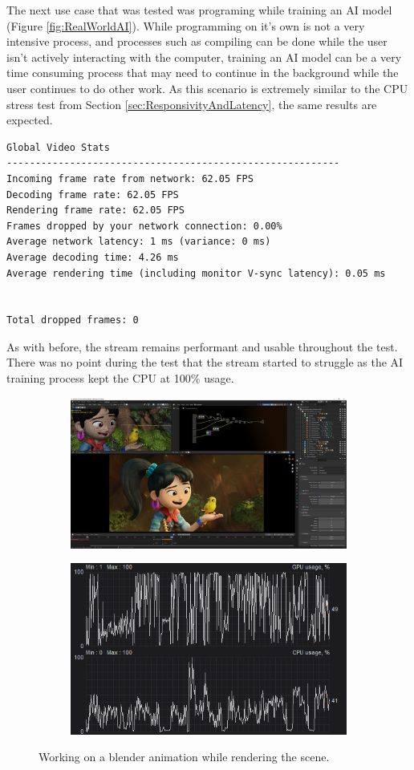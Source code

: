 The next use case that was tested was programing while training an AI model (Figure \ref{fig:RealWorldAI}).
While programming on it's own is not a very intensive process, and processes such as compiling can be done while the user isn't actively interacting with the computer, training an AI model can be a very time consuming process that may need to continue in the background while the user continues to do other work.
As this scenario is extremely similar to the CPU stress test from Section \ref{sec:ResponsivityAndLatency}, the same results are expected.

\begin{lstlisting}[style=plaintext,title=Statistics recorded while training an AI (Figure \ref{fig:RealWorldAI})]
Global Video Stats
----------------------------------------------------------
Incoming frame rate from network: 62.05 FPS
Decoding frame rate: 62.05 FPS
Rendering frame rate: 62.05 FPS
Frames dropped by your network connection: 0.00%
Average network latency: 1 ms (variance: 0 ms)
Average decoding time: 4.26 ms
Average rendering time (including monitor V-sync latency): 0.05 ms


Total dropped frames: 0
\end{lstlisting}

As with before, the stream remains performant and usable throughout the test.
There was no point during the test that the stream started to struggle as the AI training process kept the CPU at 100\% usage.

\begin{figure}[t]
  \centering
  \begin{subfigure}{1\textwidth}
    \centering
    \includegraphics[width=.9\linewidth]{Figures/realworld/blender}
  \end{subfigure}
  \begin{subfigure}{1\textwidth}
    \centering
    \includegraphics[width=.5\linewidth]{Figures/realworld/blenderstats}
  \end{subfigure}
  \caption[Streaming a 3D modeling, animation, and rendering program]{Working on a blender animation while rendering the scene.}
  \label{fig:RealWorldBlender}
\end{figure}

